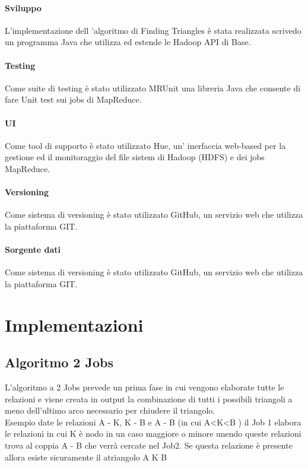 \documentclass[paper=a4, fontsize=11pt]{scrartcl}	%
\numberwithin{equation}{section}															%
\numberwithin{figure}{section}																%
\numberwithin{table}{section}																%
\begin{document}
\paragraph{Sviluppo}
L'implementazione dell 'algoritmo di Finding Triangles  è stata realizzata scrivedo un programma Java che utilizza ed estende le Hadoop API di Base.
\paragraph{Testing}
Come suite di testing è stato utilizzato MRUnit una libreria Java che consente di fare Unit test sui jobs di MapReduce.
\paragraph{UI}
Come tool di supporto è stato utilizzato Hue, un' inerfaccia web-based per la gestione ed il monitoraggio del file sistem di Hadoop (HDFS) e dei jobs MapReduce.
\paragraph{Versioning}
Come sistema di versioning è stato utilizzato GitHub, un servizio web che utilizza la piattaforma GIT.
\paragraph{Sorgente dati}
Come sistema di versioning è stato utilizzato GitHub, un servizio web che utilizza la piattaforma GIT.


\section{Implementazioni}
\subsection{Algoritmo 2 Jobs}
L'algoritmo a 2 Jobs prevede un prima fase in cui vengono elaborate tutte le relazioni e viene creata in output la combinazione di tutti i possibili triangoli a meno dell'ultimo arco necessario per chiudere il triangolo.\\
Esempio date le relazioni A - K, K - B e A - B  (in cui A<K<B ) il Job 1 elabora le relazioni in cui K è nodo in un caso maggiore o minore unendo queste relazioni trova al coppia A - B che verrà cercate nel Job2. Se questa relazione è presente allora esiste sicuramente il atriangolo A K B
\end{document}
